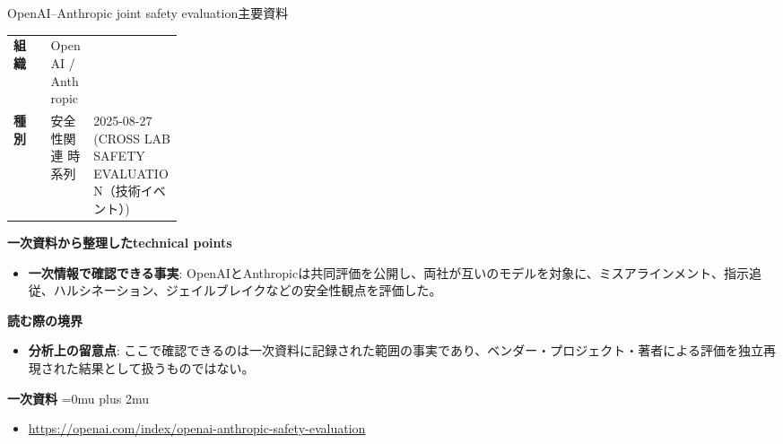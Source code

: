 \begin{technicalnote}{OpenAI–Anthropic joint safety evaluation}{主要資料}
\begingroup
\begin{tabularx}{\linewidth}{@{}>{\bfseries}p{0.22\linewidth}X@{}}
組織 & OpenAI / Anthropic \\
種別 & 安全性関連
時系列 & 2025-08-27 (CROSS LAB SAFETY EVALUATION（技術イベント）) \\
\end{tabularx}
\smallskip
{\bfseries 一次資料から整理したtechnical points}
\begin{itemize}[leftmargin=1.5em,itemsep=0.35em]
\item \textbf{一次情報で確認できる事実}: OpenAIとAnthropicは共同評価を公開し、両社が互いのモデルを対象に、ミスアラインメント、指示追従、ハルシネーション、ジェイルブレイクなどの安全性観点を評価した。
\end{itemize}
\begin{minipage}{\linewidth}
{\bfseries 読む際の境界}
\begin{itemize}[leftmargin=1.5em,itemsep=0.35em]
\item \textbf{分析上の留意点}: ここで確認できるのは一次資料に記録された範囲の事実であり、ベンダー・プロジェクト・著者による評価を独立再現された結果として扱うものではない。
\end{itemize}
\begin{samepage}
{\bfseries 一次資料}
\begingroup\sloppy
\Urlmuskip=0mu plus 2mu\relax
\begin{itemize}[leftmargin=1.5em,itemsep=0.25em]
\item {\scriptsize\url{https://openai.com/index/openai-anthropic-safety-evaluation}}
\end{itemize}
\endgroup
\end{samepage}
\end{minipage}
\endgroup
\end{technicalnote}
\medskip

